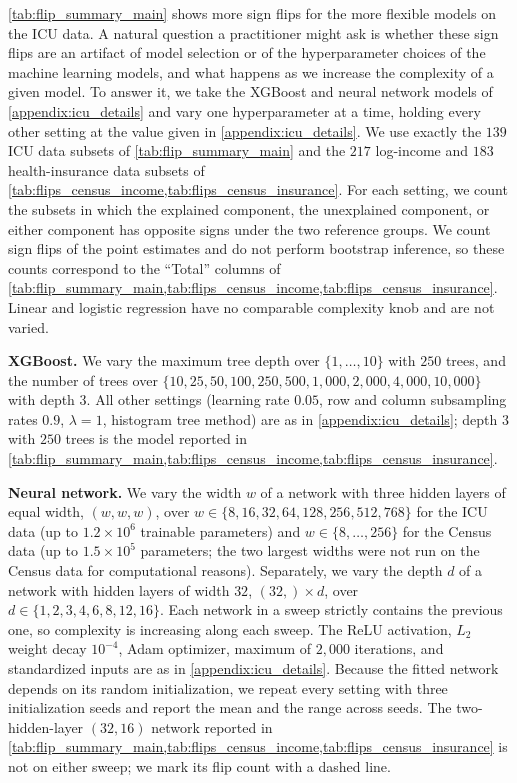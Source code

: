 \cref{tab:flip_summary_main} shows more sign flips for the more flexible models on the ICU data. A natural question a practitioner might ask is whether these sign flips are an artifact of model selection or of the hyperparameter choices of the machine learning models, and what happens as we increase the complexity of a given model. %
 To answer it, we take the XGBoost and neural network models of \cref{appendix:icu_details} and vary one hyperparameter at a time, holding every other setting at the value given in \cref{appendix:icu_details}. We use exactly the $139$ ICU data subsets of \cref{tab:flip_summary_main} and the $217$ log-income and $183$ health-insurance data subsets of \cref{tab:flips_census_income,tab:flips_census_insurance}. For each setting, we count the subsets in which the explained component, the unexplained component, or either component has opposite signs under the two reference groups. We count sign flips of the point estimates and do not perform bootstrap inference, so these counts correspond to the ``Total'' columns of \cref{tab:flip_summary_main,tab:flips_census_income,tab:flips_census_insurance}. Linear and logistic regression have no comparable complexity knob and are not varied.

\textbf{XGBoost.} We vary the maximum tree depth over $\{1, \dots, 10\}$ with $250$ trees, and the number of trees over $\{10, 25, 50, 100, 250, 500, 1{,}000, 2{,}000, 4{,}000, 10{,}000\}$ with depth $3$. All other settings (learning rate $0.05$, row and column subsampling rates $0.9$, $\lambda = 1$, histogram tree method) are as in \cref{appendix:icu_details}; depth $3$ with $250$ trees is the model reported in \cref{tab:flip_summary_main,tab:flips_census_income,tab:flips_census_insurance}.

\textbf{Neural network.} We vary the width $w$ of a network with three hidden layers of equal width, $(w, w, w)$, over $w \in \{8, 16, 32, 64, 128, 256, 512, 768\}$ for the ICU data (up to $1.2 \times 10^6$ trainable parameters) and $w \in \{8, \dots, 256\}$ for the Census data (up to $1.5 \times 10^5$ parameters; the two largest widths were not run on the Census data for computational reasons). Separately, we vary the depth $d$ of a network with hidden layers of width $32$, $(32,) \times d$, over $d \in \{1, 2, 3, 4, 6, 8, 12, 16\}$. Each network in a sweep strictly contains the previous one, so complexity is increasing along each sweep. The ReLU activation, $L_2$ weight decay $10^{-4}$, Adam optimizer, maximum of $2{,}000$ iterations, and standardized inputs are as in \cref{appendix:icu_details}. Because the fitted network depends on its random initialization, we repeat every setting with three initialization seeds and report the mean and the range across seeds. The two-hidden-layer $(32, 16)$ network reported in \cref{tab:flip_summary_main,tab:flips_census_income,tab:flips_census_insurance} is not on either sweep; we mark its flip count with a dashed line.

